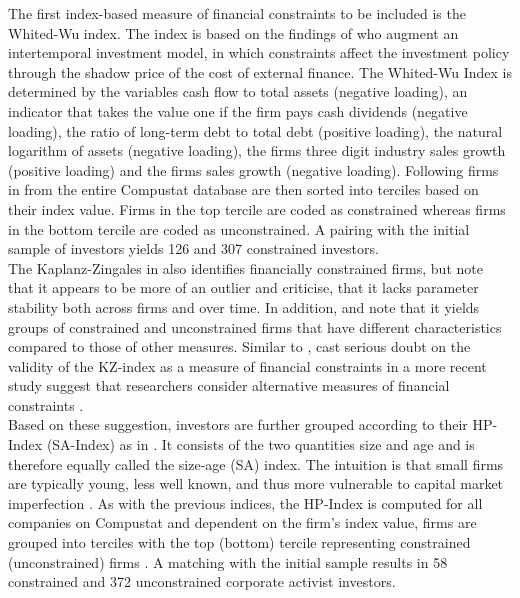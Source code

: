 \documentclass[12pt]{article}
\begin{document}
The first index-based measure of financial constraints to be included is the Whited-Wu index. The index is based on the findings of \citet[p.543]{Whited2006} who augment an intertemporal investment model, in which constraints affect the investment policy through the shadow price of the cost of external finance. The Whited-Wu Index is determined by the variables cash flow to total assets (negative loading), an indicator that takes the value one if the firm pays cash dividends (negative loading), the ratio of long-term debt to total debt (positive loading), the natural logarithm of assets (negative loading), the firms three digit industry sales growth (positive loading) and the firms sales growth (negative loading). Following \citet[p.38]{Farre-mensa2013} firms in from the entire Compustat database are then sorted into terciles based on their index value. Firms in the top tercile are coded as constrained whereas firms in the bottom tercile are coded as unconstrained. A pairing with the initial sample of investors yields 126 and 307 constrained investors.\\
The Kaplanz-Zingales in also identifies financially constrained firms, but \citet[p.29]{Farre-mensa2013} note that it appears to be more of an outlier and \citet{Whited2006} criticise, that it lacks parameter stability both across firms and over time. In addition, \citet[p.111]{Khatami2014} and \citet[p.1779]{Almeida2004} note that it yields groups of constrained and unconstrained firms that have different characteristics compared to those of other measures. Similar to \citet[p.546]{Whited2006}, \citet[p.1909]{hadlock2010} cast serious doubt on the validity of the KZ-index as a measure of financial constraints in a more recent study suggest that researchers consider alternative measures of financial constraints \citep[p.1938]{hadlock2010}.\\
Based on these suggestion, investors are further grouped according to their HP-Index (SA-Index) as in \citet[p.1929]{hadlock2010}. It consists of the two quantities size and age and is therefore equally called the size-age (SA) index. The intuition is that small firms are typically young, less well known, and thus more vulnerable to capital market imperfection \citep[p.1790]{Almeida2004}. As with the previous indices, the HP-Index is computed for all companies on Compustat and dependent on the firm's index value, firms are grouped into terciles with the top (bottom) tercile representing constrained (unconstrained) firms \citep[p.29]{Farre-mensa2013}. A matching with the initial sample results in 58 constrained and 372 unconstrained corporate activist investors. 
\end{document}
